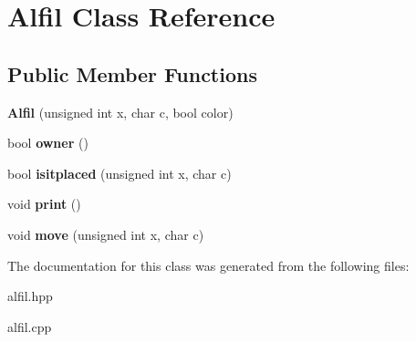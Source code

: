 \hypertarget{classAlfil}{\section{Alfil Class Reference}
\label{classAlfil}
}
\subsection*{Public Member Functions}
\begin{DoxyCompactItemize}
\item 
\hypertarget{classAlfil_afdca3a6190bcfef57559c169976ca848}{{\bfseries Alfil} (unsigned int x, char c, bool color)}\label{classAlfil_afdca3a6190bcfef57559c169976ca848}

\item 
\hypertarget{classAlfil_a749cbffef1a9dc1ac15667e441ccd324}{bool {\bfseries owner} ()}\label{classAlfil_a749cbffef1a9dc1ac15667e441ccd324}

\item 
\hypertarget{classAlfil_af8a188a977d544b32862265a3fd5cd5d}{bool {\bfseries isitplaced} (unsigned int x, char c)}\label{classAlfil_af8a188a977d544b32862265a3fd5cd5d}

\item 
\hypertarget{classAlfil_ad5ef6ffc7f076d69135d6f82ca6a378d}{void {\bfseries print} ()}\label{classAlfil_ad5ef6ffc7f076d69135d6f82ca6a378d}

\item 
\hypertarget{classAlfil_a7d254217ae872c27a7f70894dd5dd916}{void {\bfseries move} (unsigned int x, char c)}\label{classAlfil_a7d254217ae872c27a7f70894dd5dd916}

\end{DoxyCompactItemize}


The documentation for this class was generated from the following files\-:\begin{DoxyCompactItemize}
\item 
alfil.\-hpp\item 
alfil.\-cpp\end{DoxyCompactItemize}
